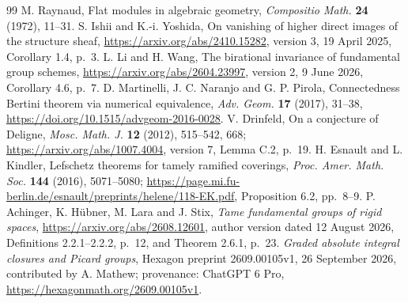 \begin{thebibliography}{99}
 M. Raynaud, Flat modules in algebraic geometry,
\emph{Compositio Math.} \textbf{24} (1972), 11--31.
 S. Ishii and K.-i. Yoshida,
On vanishing of higher direct images of the structure sheaf,
\url{https://arxiv.org/abs/2410.15282}, version 3, 19 April 2025,
Corollary 1.4, p.~3.
 L. Li and H. Wang,
The birational invariance of fundamental group schemes,
\url{https://arxiv.org/abs/2604.23997}, version 2, 9 June 2026,
Corollary 4.6, p.~7.
 D. Martinelli, J. C. Naranjo and G. P. Pirola,
Connectedness Bertini theorem via numerical equivalence,
\emph{Adv. Geom.} \textbf{17} (2017), 31--38,
\url{https://doi.org/10.1515/advgeom-2016-0028}.
 V. Drinfeld, On a conjecture of Deligne,
\emph{Mosc. Math. J.} \textbf{12} (2012), 515--542, 668;
\url{https://arxiv.org/abs/1007.4004}, version 7,
Lemma C.2, p.~19.
 H. Esnault and L. Kindler,
Lefschetz theorems for tamely ramified coverings,
\emph{Proc. Amer. Math. Soc.} \textbf{144} (2016), 5071--5080;
\url{https://page.mi.fu-berlin.de/esnault/preprints/helene/118-EK.pdf},
Proposition 6.2, pp.~8--9.
 P. Achinger, K. H\"ubner, M. Lara and J. Stix,
\emph{Tame fundamental groups of rigid spaces},
\url{https://arxiv.org/abs/2608.12601}, author version dated
12 August 2026, Definitions 2.2.1--2.2.2, p.~12,
and Theorem 2.6.1, p.~23.
 \emph{Graded absolute integral closures and
Picard groups}, Hexagon preprint 2609.00105v1, 26 September 2026,
contributed by A. Mathew; provenance: ChatGPT 6 Pro,
\url{https://hexagonmath.org/2609.00105v1}.
\end{thebibliography}
